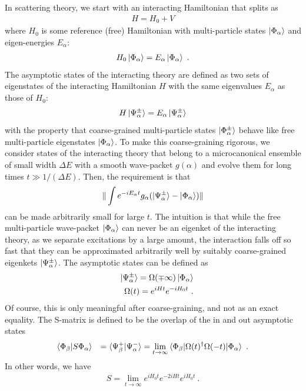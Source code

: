 \documentclass[a4paper,11pt]{article}
\theoremstyle{definition}
\newcommand{\nn}{\nonumber}
\begin{document}
In scattering theory, we start with an interacting Hamiltonian that splits as 
\begin{eqnarray}
H=H_0+V
\end{eqnarray}
where $H_0$ is some reference (free) Hamiltonian with multi-particle states $\ket{\Phi_\alpha}$ and eigen-energies $E_\alpha$:
\begin{eqnarray}
H_0\ket{\Phi_\alpha}=E_\alpha \ket{\Phi_\alpha}\ .
\end{eqnarray}
The asymptotic states of the interacting theory are defined as two sets of eigenstates of the interacting Hamiltonian $H$ with the same eigenvalues $E_\alpha$ as those of $H_0$:
\begin{eqnarray}
H\ket{\Psi_\alpha^\pm}=E_\alpha \ket{\Psi_\alpha^\pm}
\end{eqnarray}
with the property that coarse-grained multi-particle states $\ket{\Phi_\alpha^\pm}$ behave like free multi-particle eigenstates $\ket{\Phi_\alpha}$. To make this coarse-graining rigorous, we consider states of the interacting theory that belong to a microcanonical ensemble of small width $\Delta E$ with a smooth wave-packet $g(\alpha)$ and evolve them for long times $t\gg 1/(\Delta E)$. Then, the requirement is that 
\begin{eqnarray}
\|\int e^{-i E_\alpha t}g_\alpha (\ket{\Psi^\pm_\alpha}-\ket{\Phi_\alpha})\|
\end{eqnarray}
can be made arbitrarily small for large $t$. The intuition is that while the free multi-particle wave-packet $\ket{\Phi_\alpha}$ can never be an eigenket of the interacting theory, as we separate excitations by a large amount, the interaction falls off so fast that they can be approximated arbitrarily well by suitably coarse-grained eigenkets $\ket{\Psi_\alpha^\pm}$. The asymptotic states can be defined as 
\begin{eqnarray}
&&\ket{\Psi_\alpha^\pm}=\Omega(\mp \infty)\ket{\Phi_\alpha}\nn\\
&&\Omega(t)=e^{i Ht}e^{-i H_0t}\ .
\end{eqnarray}
Of course, this is only meaningful after coarse-graining, and not as an exact equality. The S-matrix is defined to be the overlap of the in and out asymptotic states
\begin{eqnarray}
\braket{\Phi_\beta|S \Phi_\alpha}&&=\braket{\Psi_\beta^+|\Psi_\alpha^-}=\lim_{t\to \infty}\braket{\Phi_\beta|\Omega(t)^\dagger \Omega(-t)|\Phi_\alpha}\ .
\end{eqnarray}
In other words, we have
\begin{eqnarray}
S=\lim_{t\to \infty} e^{i H_0t} e^{-2i Ht}e^{i H_0t}\ .
\end{eqnarray} 
\end{document}

